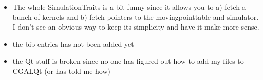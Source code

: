 \begin{itemize}
\item The whole SimulationTraits is a bit funny since it allows you to
a) fetch a bunch of kernels and b) fetch pointers to the
movingpointtable and simulator. I don't see an obvious way to keep its
simplicity and have it make more sense.

\item the bib entries has not been added yet

\item the Qt stuff is broken since no one has figured out how to add
my files to CGALQt (or has told me how)


\end{itemize}

